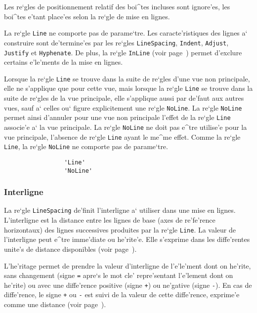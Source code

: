 {Les re`gles de positionnement relatif des boi^tes incluses sont ignore'es,
les boi^tes e'tant place'es selon la re`gle de mise en lignes.

La re`gle {\tt Line} ne comporte pas de parame`tre. Les caracte'ristiques
des lignes a` construire sont de'termine'es
par les re`gles {\tt LineSpacing}, {\tt Indent}, {\tt Adjust}, {\tt Justify}
et {\tt Hyphenate}.
De plus, la re`gle {\tt InLine} (voir page~\pageref{regleinline}) permet
d'exclure certains e'le'ments de la mise en lignes.

Lorsque la re`gle {\tt Line} se trouve dans la suite de re`gles d'une vue
non principale, elle ne s'applique que pour cette vue, mais
lorsque la re`gle {\tt Line} se trouve dans la suite de re`gles de la vue
principale, elle s'applique aussi par de'faut aux autres vues,
sauf a` celles ou` figure explicitement une re`gle {\tt NoLine}.
La re`gle {\tt NoLine} permet ainsi d'annuler pour une vue non principale
l'effet de la re`gle {\tt Line} associe'e a` la vue principale.
La re`gle {\tt NoLine} ne doit pas e^tre utilise'e pour la vue principale,
l'absence de re`gle {\tt Line} ayant le me^me effet.
Comme la re`gle {\tt Line}, la re`gle {\tt NoLine} ne comporte pas de
parame`tre.

\begin{verbatim}
                 'Line'
                 'NoLine'
\end{verbatim}

\subsubsection{Interligne}
\label{interligne}

La re`gle {\tt LineSpacing} de'finit l'interligne a` utiliser dans une mise en
lignes. L'interligne est la distance
entre les lignes de base (axes de re'fe'rence horizontaux) des lignes
successives produites par la re`gle {\tt Line}. La valeur de l'interligne
peut e^tre imme'diate ou he'rite'e. Elle s'exprime dans les diffe'rentes
unite's de distance disponibles (voir page~\pageref{unites}).

L'he'ritage permet de prendre la valeur d'interligne de l'e'le'ment dont on
he'rite, sans changement (signe {\tt =} apre`s le mot cle' repre'sentant
l'e'lement dont on he'rite) ou avec une diffe'rence positive (signe {\tt +})
ou ne'gative (signe {\tt -}). En cas de diffe'rence, le signe {\tt +} ou
{\tt -} est suivi de la valeur de cette diffe'rence, exprime'e comme une
distance (voir page~\pageref{distance}).

}
